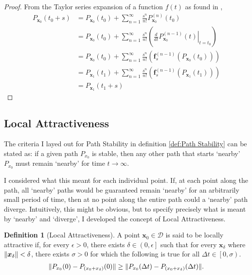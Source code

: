 \documentclass{article}
\newcommand{\B}[1]{\boldsymbol{#1}}
\DeclarePairedDelimiter\norm{\lVert}{\rVert}%
\theoremstyle{definition}
\newtheorem{definition}{Definition}[section]
\theoremstyle{remark}
\begin{document}
\begin{proof}
  From the Taylor series expansion of a function $f(t)$ as found in \cite{AdvancedCalculus},
  \begin{align}
    P_{\B{x}_0}(t_0 + s) &= P_{\B{x}_0}(t_0) + \sum_{n=1}^{\infty} \frac{s^n}{n!} P_{\B{x}_0}^{(n)}(t_0) \nonumber\\
    & = P_{\B{x}_0}(t_0) + \sum_{n=1}^{\infty} \frac{s^n}{n!} \left( \left. \frac{d}{dt}P_{\B{x}_0}^{(n-1)}(t) \right\rvert_{t=t_0} \right) \nonumber\\
    & = P_{\B{x}_0}(t_0) + \sum_{n=1}^{\infty} \frac{s^n}{n!} \left( \B{f}_s^{(n-1)} \left( P_{\B{x}_0}(t_0) \right) \right) \nonumber\\
    & = P_{\B{x}_1}(t_1) + \sum_{n=1}^{\infty} \frac{s^n}{n!} \left( \B{f}_s^{(n-1)} \left( P_{\B{x}_1}(t_1) \right) \right) \nonumber\\
    & = P_{\B{x}_1}(t_1 + s) \nonumber
  \end{align}
\end{proof}

\subsection{Local Attractiveness}

The criteria I layed out for Path Stability in definition \ref{def:Path Stability} can 
be stated as: if a given path $P_{x_0}$ is stable, then any other path that starts `nearby'
$P_{x_0}$ must remain `nearby' for time $t \to \infty$.

I considered what this meant for each individual point. If, at each point along the path,
all `nearby' paths would be guaranteed remain `nearby' for an arbitrarily small period of time,
then at no point along the entire path could a `nearby' path diverge. Intuitively, this might
be obvious, but to specify precisely what is meant by `nearby' and `diverge', I developed the concept 
of Local Attractiveness.  

\begin{definition}[Local Attractiveness]
  \label{def:Local Path Attractiveness}
  A point $\B{x}_0 \in \mathcal{D}$ is said to be locally attractive if,
  for every $\epsilon > 0$, there exists $\delta \in \left(0, \epsilon\right]$ such that
  for every $\B{x}_\delta$ where $\norm{\B{x}_\delta} < \delta$,
  there exists $\sigma > 0$ for which the following is true
  for all $\Delta t \in \left[0, \sigma \right)$.
  \begin{align}
  \norm{P_{x_0}(0) - P_{\left(x_0 + x_\delta\right)}(0)} \ge \norm{P_{x_0}(\Delta t) - P_{\left(x_0 + x_\delta\right)}(\Delta t)}.
  \end{align}  
\end{definition}
\end{document}
